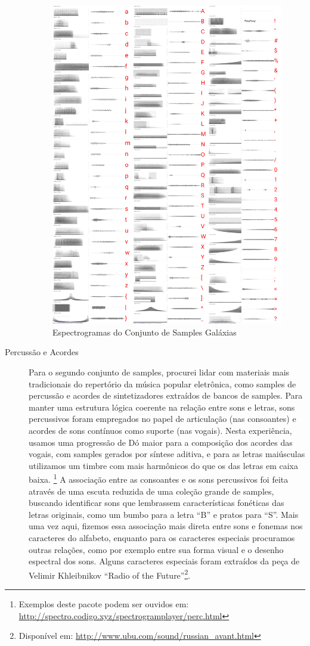 \begin{description}
\begin{figure}[htb]
    \caption{\label{samplesgalaxias}Espectrogramas do Conjunto de Samples Galáxias}
    \begin{center}
        \includegraphics[width=0.7\linewidth]{pictures/cap3/bandagalaxias.jpg}
    \end{center}
\end{figure}


\item[Percussão e Acordes] Para o segundo conjunto de samples, procurei lidar com materiais mais tradicionais do repertório da música popular eletrônica, como samples de percussão e acordes de sintetizadores extraídos de bancos de samples. Para manter uma estrutura lógica coerente na relação entre sons e letras, sons percussivos foram empregados no papel de articulação (nas consoantes) e acordes de sons contínuos como suporte (nas vogais). Nesta experiência, usamos uma progressão de Dó maior para a composição dos acordes das vogais, com samples gerados por síntese aditiva, e para as letras maiúsculas utilizamos um timbre com mais harmônicos do que os das letras em caixa baixa. \footnote{Exemplos deste pacote podem ser ouvidos em: \url{http://spectro.codigo.xyz/spectrogramplayer/perc.html} }
A associação entre as consoantes e os sons percussivos foi feita através de uma escuta reduzida de uma coleção grande de samples, buscando identificar sons que lembrassem características fonéticas das letras originais, como um bumbo para a letra ``B'' e pratos para ``S''. Mais uma vez aqui, fizemos essa associação mais direta entre sons e fonemas nos caracteres do alfabeto, enquanto para os caracteres especiais procuramos outras relações, como por exemplo entre sua forma visual e o desenho espectral dos sons. Alguns caracteres especiais foram extraídos da peça de Velimir Khleibnikov ``Radio of the Future''\footnote{Disponível em: \url{http://www.ubu.com/sound/russian_avant.html}}.


\end{description}
